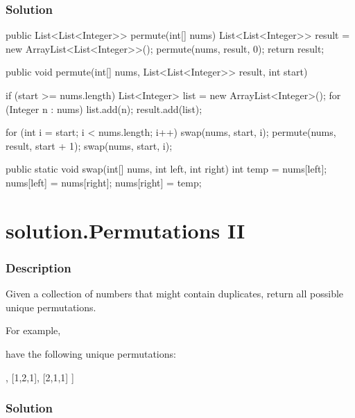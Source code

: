 \subsubsection{Solution}
\begin{Code}
public List<List<Integer>> permute(int[] nums) {
    List<List<Integer>> result = new ArrayList<List<Integer>>();
    permute(nums, result, 0);
    return result;
}

public void permute(int[] nums, List<List<Integer>> result, int start) {
    if (start >= nums.length) {
        List<Integer> list = new ArrayList<Integer>();
        for (Integer n : nums) {
            list.add(n);
        }
        result.add(list);
    }

    for (int i = start; i < nums.length; i++) {
        swap(nums, start, i);
        permute(nums, result, start + 1);
        swap(nums, start, i);
    }
}

public static void swap(int[] nums, int left, int right) {
    int temp = nums[left];
    nums[left] = nums[right];
    nums[right] = temp;
}
\end{Code}

\newpage

\section{solution.Permutations II} %

\subsubsection{Description}

Given a collection of numbers that might contain duplicates, return all possible unique permutations.

For example,

\code{[1,1,2]} have the following unique permutations:
\begin{Code}
[
  [1,1,2],
  [1,2,1],
  [2,1,1]
]
\end{Code}

\subsubsection{Solution}

